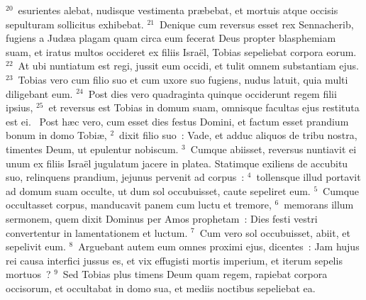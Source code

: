 ${}^{20}$~esurientes alebat, nudisque vestimenta pr\ae bebat, et mortuis atque occisis sepulturam sollicitus exhibebat.
${}^{21}$~Denique cum reversus esset rex Sennacherib, fugiens a Jud\ae a plagam quam circa eum fecerat Deus propter blasphemiam suam, et iratus multos occideret ex filiis Isra\"el, Tobias sepeliebat corpora eorum.
${}^{22}$~At ubi nuntiatum est regi, jussit eum occidi, et tulit omnem substantiam ejus.
${}^{23}$~Tobias vero cum filio suo et cum uxore suo fugiens, nudus latuit, quia multi diligebant eum.
${}^{24}$~Post dies vero quadraginta quinque occiderunt regem filii ipsius,
${}^{25}$~et reversus est Tobias in domum suam, omnisque facultas ejus restituta est ei.
~Post h\ae c vero, cum esset dies festus Domini, et factum esset prandium bonum in domo Tobi\ae ,
${}^{2}$~dixit filio suo~: Vade, et adduc aliquos de tribu nostra, timentes Deum, ut epulentur nobiscum.
${}^{3}$~Cumque abiisset, reversus nuntiavit ei unum ex filiis Isra\"el jugulatum jacere in platea. Statimque exiliens de accubitu suo, relinquens prandium, jejunus pervenit ad corpus~:
${}^{4}$~tollensque illud portavit ad domum suam occulte, ut dum sol occubuisset, caute sepeliret eum.
${}^{5}$~Cumque occultasset corpus, manducavit panem cum luctu et tremore,
${}^{6}$~memorans illum sermonem, quem dixit Dominus per Amos prophetam~: Dies festi vestri convertentur in lamentationem et luctum.
${}^{7}$~Cum vero sol occubuisset, abiit, et sepelivit eum.
${}^{8}$~Arguebant autem eum omnes proximi ejus, dicentes~: Jam hujus rei causa interfici jussus es, et vix effugisti mortis imperium, et iterum sepelis mortuos~?
${}^{9}$~Sed Tobias plus timens Deum quam regem, rapiebat corpora occisorum, et occultabat in domo sua, et mediis noctibus sepeliebat ea.


